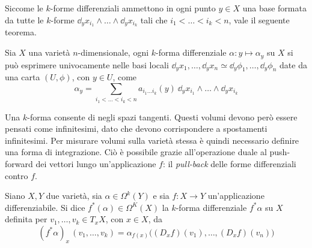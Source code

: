 Siccome le $k$-forme differenziali ammettono in ogni punto $y \in X$ una base formata da tutte le $k$-forme $\dd_y x_{i_1} \wedge \ldots \wedge \dd_y x_{i_k}$ tali che $i_1 < \ldots < i_k < n$, vale il seguente teorema.

\begin{theorem}
  Sia $X$ una varietà $n$-dimensionale, ogni $k$-forma differenziale $\alpha: y \mapsto \alpha_y$ su $X$ si può esprimere univocamente nelle basi locali $\dd_y x_1, \ldots, \dd_y x_n \simeq \dd_y \phi_1, \ldots, \dd_y \phi_n$ date da una carta $(U, \phi)$, con $y \in U$, come 
  \begin{equation*}
    \alpha_y = \sum_{i_1 < \ldots < i_k < n} a_{i_1\ldots i_k}(y)\ \dd_y x_{i_1} \wedge \ldots \wedge \dd_y x_{i_k}
  \end{equation*}
\end{theorem}

Una $k$-forma consente di  negli spazi tangenti. Questi volumi devono però essere pensati come infinitesimi, dato che devono corrispondere a spostamenti infinitesimi. Per misurare volumi sulla varietà stessa è quindi necessario definire una forma di integrazione. Ciò è possibile grazie all'operazione duale al push-forward dei vettori lungo un'applicazione $f$: il \emph{pull-back} delle forme differenziali contro $f$.
\begin{definition}
  Siano $X,Y$ due varietà, sia $\alpha \in \Omega^k (Y)$ e sia $f:X\to Y$ un'applicazione differenziabile. Si dice  $f^*(\alpha) \in  \Omega^K(X)$ la $k$-forma differenziale $f^* \alpha$ su $X$ definita per $v_1, \ldots, v_k \in T_x X$, con $x \in X$, da \begin{equation*}
  (f^*\alpha)_x\, (v_1, \ldots, v_k) = \alpha_{f(x)}\big((D_x f)(v_1), \ldots, (D_x f)(v_n)\big)
  \end{equation*}  
\end{definition}

